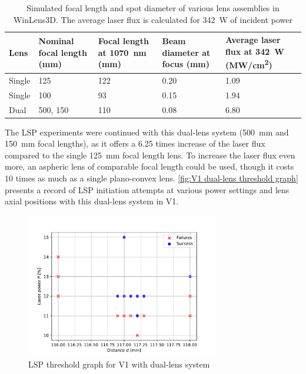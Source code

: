             \begin{table}[!ht]
                \centering
                \caption{Simulated focal length and spot diameter of various lens assemblies in WinLens3D. The average laser flux is calculated for \qty{342}{W} of incident power}
                \label{tab:laser flux}
                \begin{tabularx}{\textwidth}{@{}lX<{\raggedright}X<{\raggedright}X<{\raggedright}X<{\raggedright}@{}}
                \toprule
                Lens & Nominal focal length (\unit{mm}) & Focal length at \qty{1070}{nm} (\unit{mm})& Beam diameter at focus (\unit{mm}) & Average laser flux at \qty{342}{W} (\unit{MW/cm^2}) \\ \midrule
                Single & 125           &  122  &    0.20   &  1.09 \\
                Single & 100           &  93   &    0.15   &  1.94 \\
                Dual & 500, 150      &  110  &    0.08   &  6.80 \\ %
                \bottomrule
                \end{tabularx}
            \end{table}
            The LSP experiments were continued with this dual-lens system (\qty{500}{mm} and \qty{150}{mm} focal lengths), as it offers a 6.25 times increase of the laser flux compared to the single \qtylist{125}{mm} focal length lens. To increase the laser flux even more, an aspheric lens of comparable focal length could be used, though it costs 10 times as much as a single plano-convex lens. \autoref{fig:V1 dual-lens threshold graph} presents a record of LSP initiation attempts at various power settings and lens axial positions with this dual-lens system in V1.
            \begin{figure}[!ht]
                \centering
                \includegraphics[width=0.75\textwidth]{assets/4 experiments/duallens_focus_threshold.pdf}
                \caption{LSP threshold graph for V1 with dual-lens system}
                \label{fig:V1 dual-lens threshold graph}
            \end{figure}
